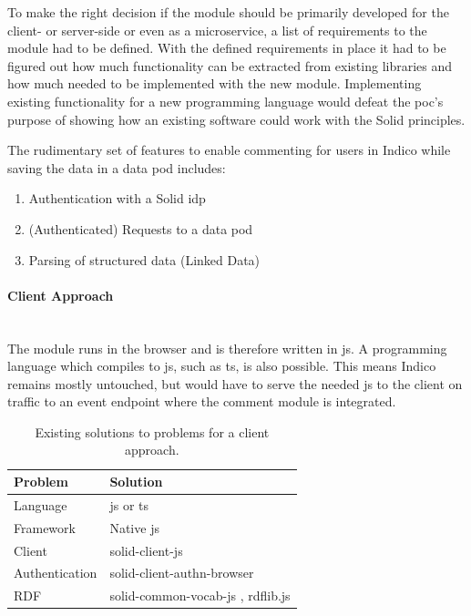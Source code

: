 To make the right decision if the module should be primarily developed for the client- or server-side or even as a microservice, a list of requirements to the module had to be defined. With the defined requirements in place it had to be figured out how much functionality can be extracted from existing libraries and how much needed to be implemented with the new module. Implementing existing functionality for a new programming language would defeat the \gls{poc}’s purpose of showing how an existing software could work with the Solid principles.

The rudimentary set of features to enable commenting for users in Indico while saving the data in a data pod includes: 

\begin{enumerate}
    \item Authentication with a Solid \gls{idp}
    \item (Authenticated) Requests to a data pod
    \item Parsing of structured data (Linked Data)
\end{enumerate}

\paragraph{Client Approach}\mbox{}\\

The module runs in the browser and is therefore written in \gls{js}. A programming language which compiles to \gls{js}, such as \gls{ts}, is also possible. This means Indico remains mostly untouched, but would have to serve the needed \gls{js} to the client on traffic to an event endpoint where the comment module is integrated.

\begin{table}[h!]
    \centering
    \begin{tabular}{| l | l |} 
     \hline
     Problem & Solution \\
     \hline
      Language & \gls{js} or \gls{ts}  \\
      Framework & Native \gls{js}  \\
      Client & solid-client-js \cite{solid-client-js}  \\
      Authentication & solid-client-authn-browser \cite{solid-client-authn-browser} \\
      RDF & solid-common-vocab-js \cite{solid-common-vocab-js}, rdflib.js \cite{rdflib.js}  \\
     \hline
    \end{tabular}
    \vspace{0.75cm}
    \caption{Existing solutions to problems for a client approach.}
    \label{table:1}
\end{table}

